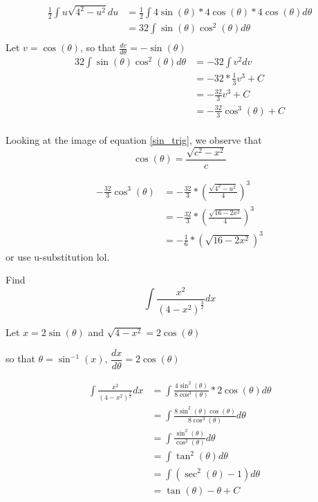 \begin{center}
\begin{example}{}{}
    	\begin{align*}
    	    \frac{1}{2}\int u\sqrt{4^2-u^2}du&=\frac{1}{2}\int 4\sin{(\theta)}*4\cos{(\theta)}*4\cos{(\theta)}d\theta\\
    	    &=32\int\sin{(\theta)}\cos^2{(\theta)}d\theta\\
    	\end{align*}
    	Let $v=\cos{(\theta)}$, so that $\frac{dv}{d\theta}=-\sin{(\theta)}$
    	\begin{align*}
    	    32\int\sin{(\theta)}\cos^2{(\theta)}d\theta&=-32\int v^2 dv\\
    	    &=-32*\frac{1}{3}v^3+C\\
    	    &=-\frac{32}{3}v^3+C\\
    	    &=-\frac{32}{3}\cos^3{(\theta)}+C\\
    	\end{align*}
    	
    	Looking at the image of equation \ref{sin_trig}, we observe that
    	$$\cos{(\theta)}=\frac{\sqrt{c^2-x^2}}{c}$$
    	
    	
    	\begin{align*}
    	    -\frac{32}{3}\cos^3{(\theta)}&=-\frac{32}{3}*\left(\frac{\sqrt{4^2-u^2}}{4}\right)^3\\
    	    &=-\frac{32}{3}*\left(\frac{\sqrt{16-2x^2}}{4}\right)^3\\
    	    &=-\frac{1}{6}*\left(\sqrt{16-2x^2}\right)^3
    	\end{align*}
    	or use u-substitution lol.
    	\end{example}
    	
    	\begin{example}{}{}
    	Find
    	$$\int \frac{x^2}{\left(4-x^2\right)^\frac{3}{2}}dx$$
    	
    	Let $x=2\sin{(\theta)}$ and $\sqrt{4-x^2}=2\cos{(\theta)}$
    	
    	so that $\theta=\sin^{-1}{(x)}$, $\dfrac{dx}{d\theta}=2\cos{(\theta)}$
    	
    	\begin{align*}
    	    \int \frac{x^2}{\left(4-x^2\right)^\frac{3}{2}}dx&=\int \frac{4\sin^2{(\theta)}}{8\cos^3{(\theta)}}*2\cos{(\theta)}d\theta\\
    	    &=\int\frac{8\sin^2{(\theta)\cos{(\theta)}}}{8\cos^3{(\theta)}}d\theta\\
    	    &=\int\frac{\sin^2{(\theta)}}{\cos^2{(\theta)}}d\theta\\
    	    &=\int \tan^2{(\theta)}d\theta\\
    	    &=\int \left(\sec^2{(\theta)}-1\right)d\theta\\
    	    &=\tan{(\theta)}-\theta+C
    	\end{align*}
    	

\end{example}
\end{center}
